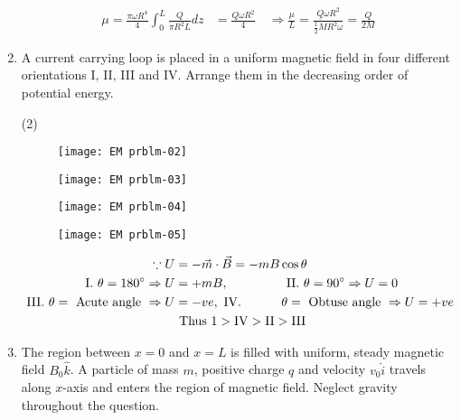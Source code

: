 \begin{enumerate}
\begin{answer}
\begin{align*}
		\mu=\frac{\pi \omega R^{4}}{4} \int_{0}^{L} \frac{Q}{\pi R^{2} L} d z&=\frac{Q \omega R^{2}}{4} \quad \Rightarrow \frac{\mu}{L}=\frac{\underline{Q} \omega R^{2}}{\frac{1}{2} M R^{2} \omega}=\frac{Q}{2 M}
		\end{align*}
	\end{answer}
	\item  A current carrying loop is placed in a uniform magnetic field in four different orientations I, II, III and IV. Arrange them in the decreasing order of potential energy.
	 \begin{tasks}(2)
		\task[\textbf{I.}]\begin{figure}[H]
			\centering
			\texttt{[image: EM prblm-02]}
		\end{figure}
		\task[\textbf{II.}]\begin{figure}[H]
			\centering
			\texttt{[image: EM prblm-03]}
		\end{figure}
		\begin{figure}[H]
			\centering
			\texttt{[image: EM prblm-04]}
		\end{figure}
		\task[\textbf{IV.}] \begin{figure}[H]
			\centering
			\texttt{[image: EM prblm-05]}
		\end{figure}
	\end{tasks}
	\begin{answer}
		\begin{align*}
				\because U&=-\vec{m} \cdot \vec{B}=-m B \cos \theta \\
	\text { I. } \theta=180^{\circ} \Rightarrow U&=+m B, \hspace{1.5cm} \text { II. } \theta=90^{\circ} \Rightarrow U=0 \\
	 \text { III. } \theta=\text { Acute angle } \Rightarrow U&=-v e,  \text { IV. } \hspace{1cm}\theta=\text { Obtuse angle } \Rightarrow U=+v e \\ &\text { Thus } 1>\mathrm{IV}>\mathrm{II}>\mathrm{III} 
		\end{align*}
	\end{answer}
	\item The region between $x=0$ and $x=L$ is filled with uniform, steady magnetic field $B_{0} \hat{k}$. A particle of mass $m$, positive charge $q$ and velocity $v_{0} \hat{i}$ travels along $x$-axis and enters the region of magnetic field. Neglect gravity throughout the question.\\

\end{enumerate}
